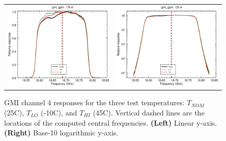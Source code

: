 \begin{figure}[htp]
  \centering
  \begin{tabular}{c c}
    \includegraphics[scale=0.3]{graphics/lin/gmi_gpm-4.eps} &
    \includegraphics[scale=0.3]{graphics/log/gmi_gpm-4.eps}
  \end{tabular}
  \caption{GMI channel 4 responses for the three test temperatures: $T_{NOM}$ (25\textdegree{}C), $T_{LO}$ (-10\textdegree{}C), and $T_{HI}$ (45\textdegree{}C). Vertical dashed lines are the locations of the computed central frequencies. \textbf{(Left)} Linear y-axis. \textbf{(Right)} Base-10 logarithmic y-axis.}
  \label{fig:ch4_response}
\end{figure}

